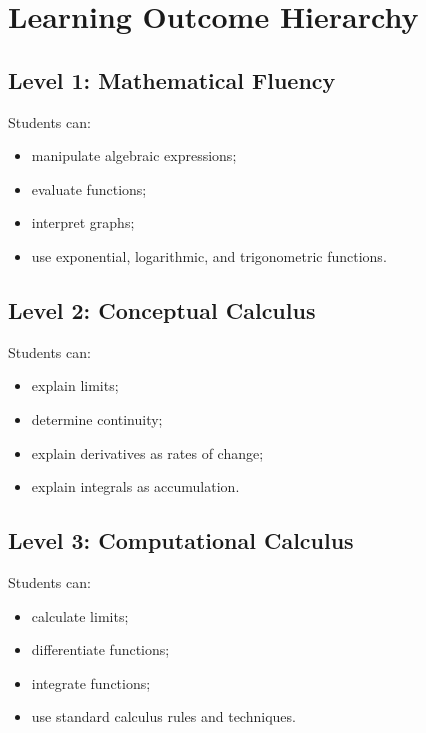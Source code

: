 \documentclass[11pt]{article}
\begin{document}

\section{Learning Outcome Hierarchy}

\subsection{Level 1: Mathematical Fluency}

Students can:

\begin{itemize}
    \item manipulate algebraic expressions;
    \item evaluate functions;
    \item interpret graphs;
    \item use exponential, logarithmic, and trigonometric functions.
\end{itemize}

\subsection{Level 2: Conceptual Calculus}

Students can:

\begin{itemize}
    \item explain limits;
    \item determine continuity;
    \item explain derivatives as rates of change;
    \item explain integrals as accumulation.
\end{itemize}

\subsection{Level 3: Computational Calculus}

Students can:

\begin{itemize}
    \item calculate limits;
    \item differentiate functions;
    \item integrate functions;
    \item use standard calculus rules and techniques.
\end{itemize}
\end{document}
